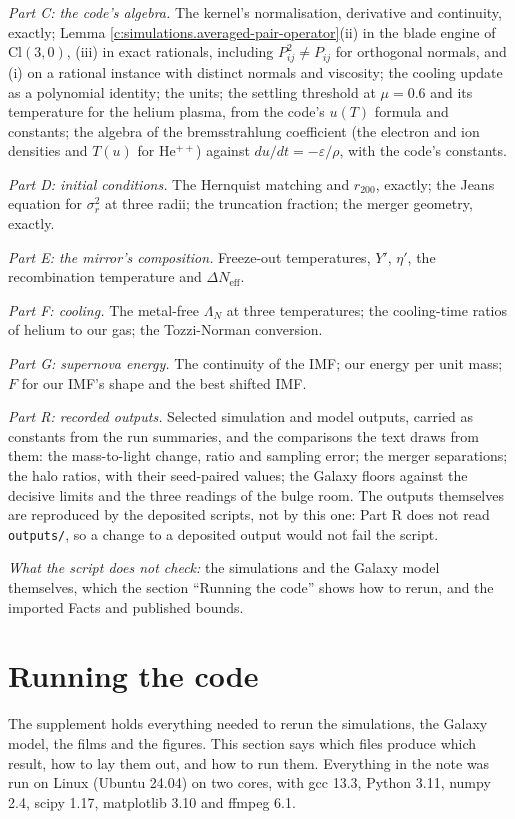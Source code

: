 \documentclass[11pt]{article}
\theoremstyle{definition}
\theoremstyle{plain}
\providecommand{\Cl}{}\renewcommand{\Cl}{\mathrm{Cl}}
\providecommand{\file}{}\renewcommand{\file}[1]{\texttt{#1}}
\begin{document}
\emph{Part C: the code's algebra.} The kernel's normalisation, derivative and continuity, exactly; Lemma \ref{c:simulations.averaged-pair-operator}(ii) in the blade engine of $\Cl(3,0)$, (iii) in exact rationals, including $P_{ij}^{2} \ne P_{ij}$ for orthogonal normals, and (i) on a rational instance with distinct normals and viscosity; the cooling update as a polynomial identity; the units; the settling threshold at $\mu = 0.6$ and its temperature for the helium plasma, from the code's $u(T)$ formula and constants; the algebra of the bremsstrahlung coefficient (the electron and ion densities and $T(u)$ for He$^{++}$) against $du/dt = -\varepsilon/\rho$, with the code's constants.

\emph{Part D: initial conditions.} The Hernquist matching and $r_{200}$, exactly; the Jeans equation for $\sigma_{r}^{2}$ at three radii; the truncation fraction; the merger geometry, exactly.

\emph{Part E: the mirror's composition.} Freeze-out temperatures, $Y'$, $\eta'$, the recombination temperature and $\Delta N_{\mathrm{eff}}$.

\emph{Part F: cooling.} The metal-free $\Lambda_{N}$ at three temperatures; the cooling-time ratios of helium to our gas; the Tozzi-Norman conversion.

\emph{Part G: supernova energy.} The continuity of the IMF; our energy per unit mass; $F$ for our IMF's shape and the best shifted IMF.

\emph{Part R: recorded outputs.} Selected simulation and model outputs, carried as constants from the run summaries, and the comparisons the text draws from them: the mass-to-light change, ratio and sampling error; the merger separations; the halo ratios, with their seed-paired values; the Galaxy floors against the decisive limits and the three readings of the bulge room. The outputs themselves are reproduced by the deposited scripts, not by this one: Part R does not read \file{outputs/}, so a change to a deposited output would not fail the script.

\emph{What the script does not check:} the simulations and the Galaxy model themselves, which the section ``Running the code'' shows how to rerun, and the imported Facts and published bounds.

\section{Running the code}

\label{c:note.simulations.setting-running-code}
The supplement \cite{ButlerSuppT14b} holds everything needed to rerun the simulations, the Galaxy model, the films and the figures. This section says which files produce which result, how to lay them out, and how to run them. Everything in the note was run on Linux (Ubuntu 24.04) on two cores, with gcc 13.3, Python 3.11, numpy 2.4, scipy 1.17, matplotlib 3.10 and ffmpeg 6.1.
\end{document}
